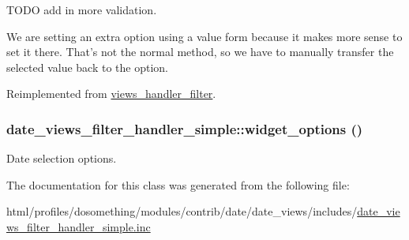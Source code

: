 TODO add in more validation.

We are setting an extra option using a value form because it makes more sense to set it there. That's not the normal method, so we have to manually transfer the selected value back to the option. 

Reimplemented from \hyperlink{classviews__handler__filter_a55b051bcd047b7251e6dbbece8e0a081}{views\_\-handler\_\-filter}.\hypertarget{classdate__views__filter__handler__simple_ada529cd1430ae95542d8f3531f777e90}{
\subsubsection[{widget\_\-options}]{\setlength{\rightskip}{0pt plus 5cm}date\_\-views\_\-filter\_\-handler\_\-simple::widget\_\-options ()}}
\label{classdate__views__filter__handler__simple_ada529cd1430ae95542d8f3531f777e90}
Date selection options. 

The documentation for this class was generated from the following file:\begin{DoxyCompactItemize}
\item 
html/profiles/dosomething/modules/contrib/date/date\_\-views/includes/\hyperlink{date__views__filter__handler__simple_8inc}{date\_\-views\_\-filter\_\-handler\_\-simple.inc}\end{DoxyCompactItemize}
